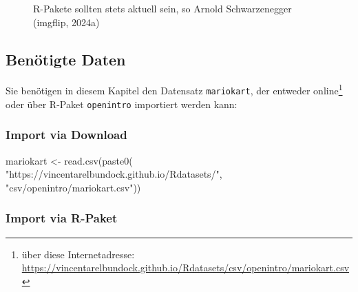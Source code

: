 \documentclass[
  letterpaper,
]{scrbook}
\newenvironment{Shaded}{\begin{snugshade}}{\end{snugshade}}
\newcommand{\FunctionTok}[1]{\textcolor[rgb]{0.28,0.35,0.67}{#1}}
\newcommand{\NormalTok}[1]{\textcolor[rgb]{0.00,0.23,0.31}{#1}}
\newcommand{\OtherTok}[1]{\textcolor[rgb]{0.00,0.23,0.31}{#1}}
\newcommand{\StringTok}[1]{\textcolor[rgb]{0.13,0.47,0.30}{#1}}
\theoremstyle{definition}
\theoremstyle{definition}
\theoremstyle{definition}
\theoremstyle{remark}
\begin{document}
\begin{figure}


\caption{\label{fig-arnie}R-Pakete sollten stets aktuell sein, so Arnold
Schwarzenegger (imgflip, 2024a)}

\end{figure}%

\subsection{Benötigte Daten}\label{benuxf6tigte-daten}

Sie benötigen in diesem Kapitel den Datensatz \texttt{mariokart}, der
entweder online\footnote{ über diese Internetadresse:
  \url{https://vincentarelbundock.github.io/Rdatasets/csv/openintro/mariokart.csv}}
oder über R-Paket \texttt{openintro} importiert werden kann:

\subsubsection{Import via Download}\label{import-via-download}

\begin{Shaded}
\begin{Highlighting}[]
\NormalTok{mariokart }\OtherTok{\textless{}{-}} \FunctionTok{read.csv}\NormalTok{(}\FunctionTok{paste0}\NormalTok{(}
  \StringTok{"https://vincentarelbundock.github.io/Rdatasets/"}\NormalTok{,}
  \StringTok{"csv/openintro/mariokart.csv"}\NormalTok{))}
\end{Highlighting}
\end{Shaded}

\subsubsection{Import via R-Paket}\label{import-via-r-paket}
\end{document}
